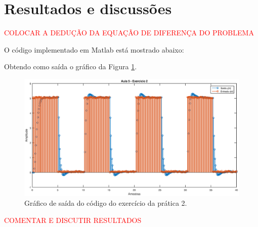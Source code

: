 \section{Resultados e discussões}
\textcolor{red}{COLOCAR A DEDUÇÃO DA EQUAÇÃO DE DIFERENÇA DO PROBLEMA}

O código implementado em Matlab está mostrado abaixo:


Obtendo como saída o gráfico da Figura \ref{saida_ex2_pr_2}.

\begin{landscape}
  \begin{figure}[!ht]
      \centering
      \includegraphics[scale = .66]{Imagens/Aula_5_exercicio2.eps}
      \caption{Gráfico de saída do código do exercício da prática 2.}
      \label{saida_ex2_pr_2}
  \end{figure}
\end{landscape}

\textcolor{red}{COMENTAR E DISCUTIR RESULTADOS}